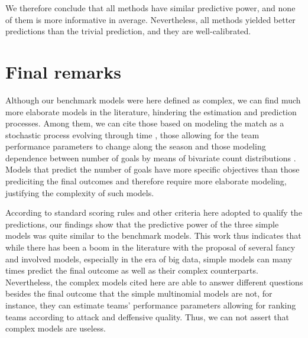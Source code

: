 \documentclass[journal,article,accept,moreauthors,pdftex,12pt,a4paper]{mdpi}
\begin{document}
    We therefore conclude that all methods have similar predictive power, and none of them is more informative in average.
    Nevertheless, all methods yielded better predictions than the trivial prediction, and they are well-calibrated.

    \section{Final remarks}
    \label{sec::remarks}

    Although our benchmark models were here defined as complex, we can find much more elaborate models in the literature, hindering the estimation and prediction processes.
    Among them, we can cite those based on modeling the match as a stochastic process evolving through time \citep{Dixon98, Volf2009, Titman2015}, those allowing for the team performance parameters to change along the season \citep{Rue2000, Crowder2002, Owen2011, Koopman2015} and those modeling dependence between number of goals by means of bivariate count distributions \citep{Dixon97, Karlis2003, McHale2007, McHale2011}. Models that predict the number of goals have more specific objectives than those prediciting the final outcomes and therefore require more elaborate modeling, justifying the complexity of such models. 

    According to standard scoring rules and other criteria here adopted to qualify the predictions, our findings show that the predictive power of the three simple models was quite similar to the benchmark models.
    {\color{red}This work thus indicates that while there has been a boom in the literature with the proposal of several fancy and involved models, especially in the era of big data, simple models can many times predict the final outcome as well as their complex counterparts. Nevertheless, the complex models cited here are able to answer different questions besides the final outcome that the simple multinomial models are not, for instance, they can estimate teams' performance parameters allowing for ranking teams according to attack and deffensive quality. Thus, we can not assert that complex models are useless.}
\end{document}
